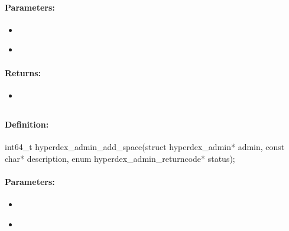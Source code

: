 \paragraph{Parameters:}
\begin{itemize}[noitemsep]
\item {}\\

\item {}\\

\end{itemize}

\paragraph{Returns:}
\begin{itemize}[noitemsep]
\item {}\\

\end{itemize}

\pagebreak
\subsection{}
\label{api:c:add_space}


\paragraph{Definition:}
\begin{ccode}
int64_t hyperdex_admin_add_space(struct hyperdex_admin* admin,
        const char* description,
        enum hyperdex_admin_returncode* status);
\end{ccode}

\paragraph{Parameters:}
\begin{itemize}[noitemsep]
\item {}\\

\item {}\\

\end{itemize}

